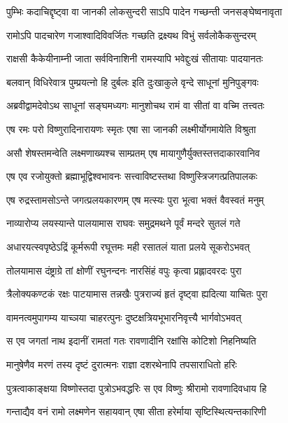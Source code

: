 \twolineshloka
{पुम्भिः कदाचिद्दृष्ट्वा वा जानकी लोकसुन्दरी}
{साऽपि पादेन गच्छन्ती जनसङ्घेष्वनावृता} %

\twolineshloka
{रामोऽपि पादचारेण गजाश्वादिविवर्जितः}
{गच्छति द्रक्ष्यथ विभुं सर्वलोकैकसुन्दरम्} %

\twolineshloka
{राक्षसी कैकेयीनाम्नी जाता सर्वविनाशिनी}
{रामस्यापि भवेद्दुःखं सीतायाः पादयानतः} %

\twolineshloka
{बलवान् विधिरेवात्र पुम्प्रयत्नो हि दुर्बलः}
{इति दुःखाकुले वृन्दे साधूनां मुनिपुङ्गवः} %

\twolineshloka
{अब्रवीद्वामदेवोऽथ साधूनां सङ्घमध्यगः}
{मानुशोचथ रामं वा सीतां वा वच्मि तत्त्वतः} %

\twolineshloka
{एष रमः परो विष्णुरादिनारायणः स्मृतः}
{एषा सा जानकी लक्ष्मीर्योगमायेति विश्रुता} %

\twolineshloka
{असौ शेषस्तमन्वेति लक्ष्मणाख्यश्च साम्प्रतम्}
{एष मायागुणैर्युक्तस्तत्तदाकारवानिव} %

\twolineshloka
{एष एव रजोयुक्तो ब्रह्माभूद्विश्वभावनः}
{सत्त्वाविष्टस्तथा विष्णुस्त्रिजगत्प्रतिपालकः} %

\twolineshloka
{एष रुद्रस्तामसोऽन्ते जगत्प्रलयकारणम्}
{एष मत्स्यः पुरा भूत्वा भक्तं वैवस्वतं मनुम्} %

\twolineshloka
{नाव्यारोप्य लयस्यान्ते पालयामास राघवः}
{समुद्रमथने पूर्वं मन्दरे सुतलं गते} %

\twolineshloka
{अधारयत्स्वपृष्ठेऽद्रिं कूर्मरूपी रघूत्तमः}
{मही रसातलं याता प्रलये सूकरोऽभवत्} %

\twolineshloka
{तोलयामास दंष्ट्राग्रे तां क्षोणीं रघुनन्दनः}
{नारसिंहं वपुः कृत्वा प्रह्लादवरदः पुरा} %

\twolineshloka
{त्रैलोक्यकण्टकं रक्षः पाटयामास तन्नखैः}
{पुत्रराज्यं हृतं दृष्ट्वा ह्यदित्या याचितः पुरा} %

\twolineshloka
{वामनत्वमुपागम्य याच्ञया चाहरत्पुनः}
{दुष्टक्षत्रियभूभारनिवृत्त्यै भार्गवोऽभवत्} %

\twolineshloka
{स एव जगतां नाथ इदानीं रामतां गतः}
{रावणादीनि रक्षांसि कोटिशो निहनिष्यति} %

\twolineshloka
{मानुषेणैव मरणं तस्य दृष्टं दुरात्मनः}
{राज्ञा दशरथेनापि तपसाराधितो हरिः} %

\twolineshloka
{पुत्रत्वाकाङ्क्षया विष्णोस्तदा पुत्रोऽभवद्धरिः}
{स एव विष्णुः श्रीरामो रावणादिवधाय हि} %

\twolineshloka
{गन्ताद्यैव वनं रामो लक्ष्मणेन सहायवान्}
{एषा सीता हरेर्माया सृष्टिस्थित्यन्तकारिणी} %

